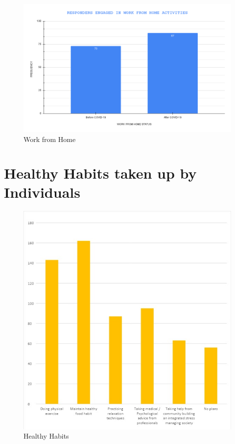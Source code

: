 \begin{figure}[h!]
	\centering
	\includegraphics[width=0.9\linewidth]{IMAGES/Image 25.png}
	\caption{Work from Home}
	\label{G25}
\end{figure}

\newpage

\section{Healthy Habits taken up by Individuals}

\begin{figure}[h!]
	\centering
	\includegraphics[width=0.9\linewidth]{IMAGES/Image 28.jpeg}
	\caption{Healthy Habits}
	\label{G28}
\end{figure}

